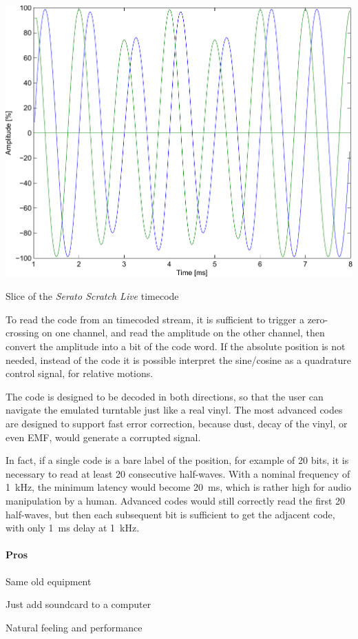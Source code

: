 \documentclass[a4paper,10pt]{article}
\makeatletter
\newenvironment{figurehere}{\def\@captype{figure}\vspace{2ex}}{\vspace{2ex}}
\makeatother
\begin{document}
\begin{multicols}{2}
\begin{figurehere}
	\label{fig:serato_timecode_slice}
	\centering
	\includegraphics[keepaspectratio=true,width=\columnwidth]{images/serato_timecode_slice.pdf}
	\caption{Slice of the \emph{Serato Scratch Live} timecode}
\end{figurehere}

To read the code from an timecoded stream, it is sufficient to trigger a
zero-crossing on one channel, and read the amplitude on the other channel,
then convert the amplitude into a bit of the code word. If the absolute
position is not needed, instead of the code it is possible interpret the
sine/cosine as a quadrature control signal, for relative motions.

The code is designed to be decoded in both directions, so that the user can
navigate the emulated turntable just like a real vinyl. The most advanced
codes are designed to support fast error correction, because dust, decay of
the vinyl, or even EMF, would generate a corrupted signal.

In fact, if a single code is a bare label of the position, for example of 20
bits, it is necessary to read at least 20 consecutive half-waves. With a
nominal frequency of 1~kHz, the minimum latency would become 20~ms, which is
rather high for audio manipulation by a human. Advanced codes would still
correctly read the first 20 half-waves, but then each subsequent bit is
sufficient to get the adjacent code, with only 1~ms delay at 1~kHz.


\paragraph{Pros}
\begin{itemize*}
	\item Same old equipment
	\item Just add soundcard to a computer
	\item Natural feeling and performance
\end{itemize*}



\end{multicols}
\end{document}

